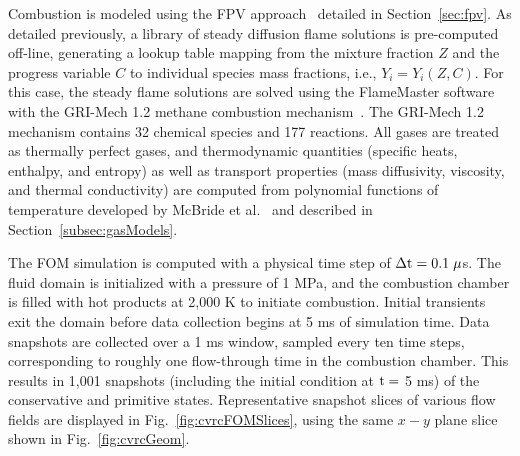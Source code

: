 Combustion is modeled using the FPV approach~\cite{Pierce2001} detailed in Section~\ref{sec:fpv}. As detailed previously, a library of steady diffusion flame solutions is pre-computed off-line, generating a lookup table mapping from the mixture fraction $Z$ and the progress variable $C$ to individual species mass fractions, i.e., $Y_i = Y_i(Z,C)$. For this case, the steady flame solutions are solved using the FlameMaster software~\cite{flamemaster} with the GRI-Mech 1.2 methane combustion mechanism~\cite{griMech}. The GRI-Mech 1.2 mechanism contains 32 chemical species and 177 reactions. All gases are treated as thermally perfect gases, and thermodynamic quantities (specific heats, enthalpy, and entropy) as well as transport properties (mass diffusivity, viscosity, and thermal conductivity) are computed from polynomial functions of temperature developed by McBride et al.~\cite{McBride1993} and described in Section~\ref{subsec:gasModels}.

The FOM simulation is computed with a physical time step of $\Delta \text{t} = 0.1 \; \mu$s. The fluid domain is initialized with a pressure of 1 MPa, and the combustion chamber is filled with hot products at 2,000 K to initiate combustion. Initial transients exit the domain before data collection begins at 5 ms of simulation time. Data snapshots are collected over a 1 ms window, sampled every ten time steps, corresponding to roughly one flow-through time in the combustion chamber. This results in 1,001 snapshots (including the initial condition at $\text{t} =$ 5 ms) of the conservative and primitive states. Representative snapshot slices of various flow fields are displayed in Fig.~\ref{fig:cvrcFOMSlices}, using the same $x-y$ plane slice shown in Fig.~\ref{fig:cvrcGeom}.

